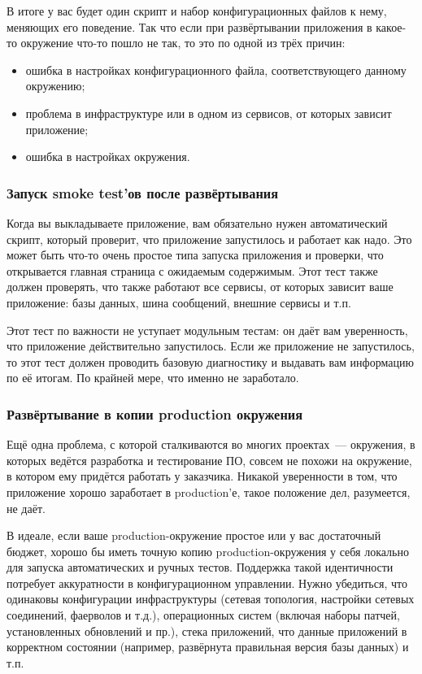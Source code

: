 \documentclass{../../text-style}
\begin{document}
В итоге у вас будет один скрипт и набор конфигурационных файлов к нему, меняющих его поведение. Так что если при развёртывании приложения в какое-то окружение что-то пошло не так, то это по одной из трёх причин:

\begin{itemize}
    \item ошибка в настройках конфигурационного файла, соответствующего данному окружению;
    \item проблема в инфраструктуре или в одном из сервисов, от которых зависит приложение;
    \item ошибка в настройках окружения.
\end{itemize}

\subsubsection{Запуск smoke test’ов после развёртывания}

Когда вы выкладываете приложение, вам обязательно нужен автоматический скрипт, который проверит, что приложение запустилось и работает как надо. Это может быть что-то очень простое типа запуска приложения и проверки, что открывается главная страница с ожидаемым содержимым. Этот тест также должен проверять, что также работают все сервисы, от которых зависит ваше приложение: базы данных, шина сообщений, внешние сервисы и т.п.

Этот тест по важности не уступает модульным тестам: он даёт вам уверенность, что приложение действительно запустилось. Если же приложение не запустилось, то этот тест должен проводить базовую диагностику и выдавать вам информацию по её итогам. По крайней мере, что именно не заработало.

\subsubsection{Развёртывание в копии production окружения}

Ещё одна проблема, с которой сталкиваются во многих проектах~--- окружения, в которых ведётся разработка и тестирование ПО, совсем не похожи на окружение, в котором ему придётся работать у заказчика. Никакой уверенности в том, что приложение хорошо заработает в production’е, такое положение дел, разумеется, не даёт.

В идеале, если ваше production-окружение простое или у вас достаточный бюджет, хорошо бы иметь точную копию production-окружения у себя локально для запуска автоматических и ручных тестов. Поддержка такой идентичности потребует аккуратности в конфигурационном управлении. Нужно убедиться, что одинаковы конфигурации инфраструктуры (сетевая топология, настройки сетевых соединений, фаерволов и т.д.), операционных систем (включая наборы патчей, установленных обновлений и пр.), стека приложений, что данные приложений в корректном состоянии (например, развёрнута правильная версия базы данных) и т.п.
\end{document}
